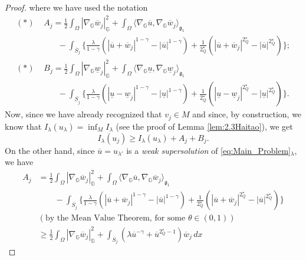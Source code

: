 \documentclass[11pt]{amsart}
\numberwithin{equation}{section} %
\theoremstyle{definition}
\begin{document}
\begin{proof}
	where we have used the notation
	\begin{align*}
		(\ast)&\,\,A_j = \frac{1}{2}\int_{\Omega}|\nabla_{\mathbb{G}}\overline{w}_j|_{\mathbb{G}}^2+
		\int_{\Omega}\langle \nabla_{\mathbb{G}}\overline{u},\nabla_{\mathbb{G}}\overline{w}_j\rangle_{\mathfrak{g}_{1}} 
		\\
		& \qquad - \int_{\overline{S}_j}
		\Big\{\frac{\lambda}{1-\gamma}(|\overline{u}+\overline{w}_j|^{1-\gamma}-|\overline{u}|^{1-\gamma})
		+\frac{1}{2^{\star}_{Q}}(|\overline{u}+\overline{w}_j|^{2^{\star}_{Q}}-|\overline{u}|^{2^{\star}_{Q}})\Big\};
		\\[0.15cm]
		(\ast)&\,\,B_j  = \frac{1}{2}\int_{\Omega}|\nabla_{\mathbb{G}}\underline{w}_j|_{\mathbb{G}}^2+
		\int_{\Omega}\langle \nabla_{\mathbb{G}}\underline{u},\nabla_{\mathbb{G}}\underline{w}_j\rangle_{\mathfrak{g}_{1}} 
		\\
		& \qquad - \int_{\underline{S}_j}
		\Big\{\frac{\lambda}{1-\gamma}(|\underline{u}-\underline{w}_j|^{1-\gamma}-|\underline{u}|^{1-\gamma})
		+\frac{1}{2^{\star}_{Q}}(|\underline{u}-\underline{w}_j|^{2^{\star}_{Q}}-|\underline{u}|^{2^{\star}_{Q}})\Big\}.
	\end{align*}
	Now, since we have already recognized that
	$v_j\in M$
	and since, by con\-stru\-ction, we know that $I_{\lambda}(u_\lambda) = \inf_M I_{\lambda}$ 
	(see the proof of Lemma \ref{lem:2.3Haitao}), we get
	\begin{equation} \label{eq:dovecontraddire}
		I_{\lambda}(u_j)\geq I_{\lambda}(u_\lambda)+A_j+B_j.
	\end{equation}
	On the other hand, since $\overline{u}=u_{\lambda'}$ is a \emph{weak supersolution}
	of \eqref{eq:Main_Problem}$_\lambda$, we have
	\begin{align*}
		A_j & = \frac{1}{2}\int_{\Omega}|\nabla_{\mathbb{G}}\overline{w}_j|_{\mathbb{G}}^2+
		\int_{\Omega}\langle \nabla_{\mathbb{G}}\overline{u},\nabla_{\mathbb{G}}\overline{w}_j\rangle_{\mathfrak{g}_{1}} 
		\\
		& \qquad - \int_{\overline{S}_j}
		\Big\{\frac{\lambda}{1-\gamma}(|\overline{u}+\overline{w}_j|^{1-\gamma}-|\overline{u}|^{1-\gamma})
		+\frac{1}{2^{\star}_{Q}}(|\overline{u}+\overline{w}_j|^{2^{\star}_{Q}}-|\overline{u}|^{2^{\star}_{Q}})\Big\} \\
		& (\text{by the Mean Value Theorem, for some $\theta\in (0,1)$}) \\
		& \geq \frac{1}{2}\int_{\Omega}|\nabla_{\mathbb{G}}\overline{w}_j|_{\mathbb{G}}^2
		+ \int_{\overline{S}_j}(\lambda \overline{u}^{-\gamma}+\overline{u}^{2^{\star}_{Q}-1})\overline{w}_j\,dx

\end{align*}
\end{proof}
\end{document}
